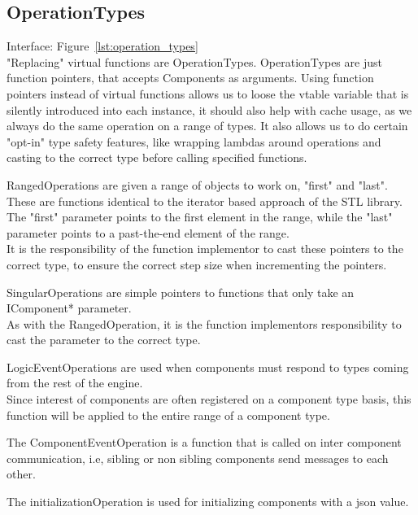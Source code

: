 \subsection{OperationTypes}
Interface: Figure~\ref{lst:operation_types}\\\noindent
"Replacing" virtual functions are OperationTypes.
OperationTypes are just function pointers, that accepts Components as arguments.
Using function pointers instead of virtual functions allows us to loose
the vtable variable that is silently introduced into each instance,
it should also help with cache usage, as we always do the same operation on a range of types.
It also allows us to do certain "opt-in" type safety features,
like wrapping lambdas around operations and casting to the correct type before calling specified functions.

RangedOperations are given a range of objects to work on, "first" and "last".
These are functions identical to the iterator based approach of the STL library.\\
The "first" parameter points to the first element in the range, while the "last" parameter points to a past-the-end element of the range.\\
It is the responsibility of the function implementor to cast these pointers to the correct type, 
to ensure the correct step size when incrementing the pointers.

SingularOperations are simple pointers to functions that only take an IComponent* parameter.\\
As with the RangedOperation, it is the function implementors responsibility to cast the parameter to the correct type.

LogicEventOperations are used when components must respond to types coming from the rest of the engine.\\
Since interest of components are often registered on a component type basis,
this function will be applied to the entire range of a component type.

The ComponentEventOperation is a function that is called on inter component communication, i.e, 
sibling or non sibling components send messages to each other.

The initializationOperation is used for initializing components with a json value.
